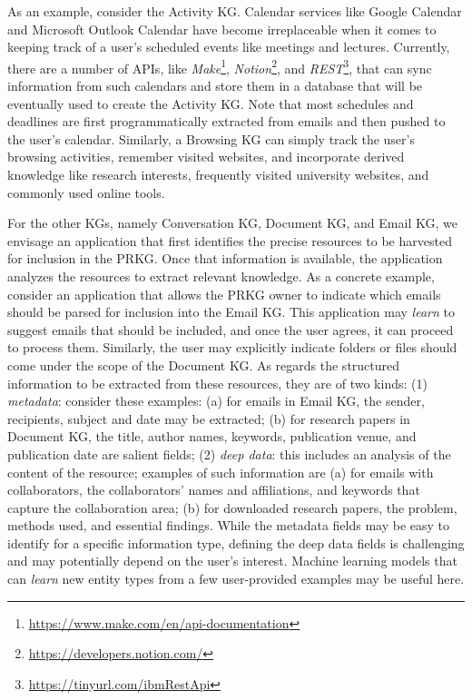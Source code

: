 \documentclass[11pt,pdftex]{article}
\begin{document}
As an example, consider the Activity KG. Calendar services like Google Calendar and Microsoft Outlook Calendar have become irreplaceable when it comes to keeping track of a user's scheduled events like meetings and lectures. Currently, there are a number of APIs, like \textit{Make}\footnote{\url{https://www.make.com/en/api-documentation}}, \textit{Notion}\footnote{\url{https://developers.notion.com/}}, and \textit{REST}\footnote{\url{https://tinyurl.com/ibmRestApi}}, that can sync information from such calendars and store them in a database that will be eventually used to create the Activity KG. Note that most schedules and deadlines are first programmatically extracted from emails and then pushed to the user's calendar. Similarly, a Browsing KG can simply track the user's browsing activities, remember visited websites, and incorporate derived knowledge like research interests, frequently visited university websites, and commonly used online tools. 

For the other KGs, namely Conversation KG, Document KG, and Email KG, we envisage an application that first identifies the precise resources to be harvested for inclusion in the PRKG. Once that information is available, the application analyzes the resources to extract relevant knowledge. As a concrete example, consider an application that allows the PRKG owner to indicate which emails should be parsed for inclusion into the Email KG. This application may \textit{learn} to suggest emails that should be included, and once the user agrees, it can proceed to process them. Similarly, the user may explicitly indicate folders or files should come under the scope of the Document KG. As regards the structured information to be extracted from these resources, they are of two kinds: (1) \textit{metadata}:  consider these examples: (a) for emails in Email KG, the sender, recipients, subject and  date may be extracted; (b) for research papers in  Document KG, the title, author names, keywords, publication venue, and publication date are salient fields; (2) \textit{deep data}: this includes an analysis of the content of the resource; examples of such information are (a) for emails with collaborators, the collaborators' names and affiliations, and keywords that capture the collaboration area; (b) for downloaded research papers, the problem, methods used, and essential findings. While the metadata fields may be easy to identify for a specific information type, defining the deep data fields is  challenging and may potentially depend on the user's interest. Machine learning models that can \textit{learn} new entity types from a few user-provided examples may be useful here.
\end{document}
